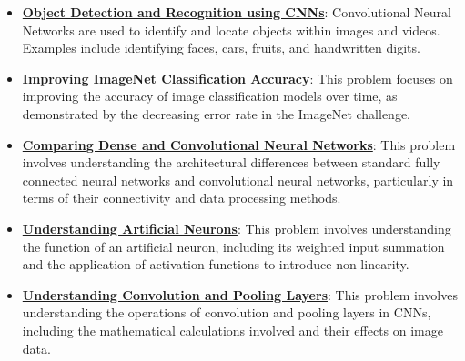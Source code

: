 \documentclass{article}%
\begin{document}
\begin{itemize}[leftmargin=*]%
\item \href{https://purdue.brightspace.com/d2l/common/assets/pdfjs-d2l-dist/1.0.14-legacy/web/viewer.html?file=\%2Fcontent\%2Fenforced\%2F1095467-wl.202510.CS.24300.001\%2F09L1-cnn.pdf\%3Fou\%3D1095467\&lang=en-us\&container=d2l-fileviewer-rendered-pdf\&fullscreen=d2l-fileviewer-rendered-pdf-dialog\&height=667#page=2}{\textbf{Object Detection and Recognition using CNNs}}: Convolutional Neural Networks are used to identify and locate objects within images and videos. Examples include identifying faces, cars, fruits, and handwritten digits.%
\item \href{https://purdue.brightspace.com/d2l/common/assets/pdfjs-d2l-dist/1.0.14-legacy/web/viewer.html?file=\%2Fcontent\%2Fenforced\%2F1095467-wl.202510.CS.24300.001\%2F09L1-cnn.pdf\%3Fou\%3D1095467\&lang=en-us\&container=d2l-fileviewer-rendered-pdf\&fullscreen=d2l-fileviewer-rendered-pdf-dialog\&height=667#page=3}{\textbf{Improving ImageNet Classification Accuracy}}: This problem focuses on improving the accuracy of image classification models over time, as demonstrated by the decreasing error rate in the ImageNet challenge.%
\item \href{https://purdue.brightspace.com/d2l/common/assets/pdfjs-d2l-dist/1.0.14-legacy/web/viewer.html?file=\%2Fcontent\%2Fenforced\%2F1095467-wl.202510.CS.24300.001\%2F09L1-cnn.pdf\%3Fou\%3D1095467\&lang=en-us\&container=d2l-fileviewer-rendered-pdf\&fullscreen=d2l-fileviewer-rendered-pdf-dialog\&height=667#page=4}{\textbf{Comparing Dense and Convolutional Neural Networks}}: This problem involves understanding the architectural differences between standard fully connected neural networks and convolutional neural networks, particularly in terms of their connectivity and data processing methods.%
\item \href{https://purdue.brightspace.com/d2l/common/assets/pdfjs-d2l-dist/1.0.14-legacy/web/viewer.html?file=\%2Fcontent\%2Fenforced\%2F1095467-wl.202510.CS.24300.001\%2F09L1-cnn.pdf\%3Fou\%3D1095467\&lang=en-us\&container=d2l-fileviewer-rendered-pdf\&fullscreen=d2l-fileviewer-rendered-pdf-dialog\&height=667#page=5}{\textbf{Understanding Artificial Neurons}}: This problem involves understanding the function of an artificial neuron, including its weighted input summation and the application of activation functions to introduce non-linearity.%
\item \href{https://purdue.brightspace.com/d2l/common/assets/pdfjs-d2l-dist/1.0.14-legacy/web/viewer.html?file=\%2Fcontent\%2Fenforced\%2F1095467-wl.202510.CS.24300.001\%2F09L1-cnn.pdf\%3Fou\%3D1095467\&lang=en-us\&container=d2l-fileviewer-rendered-pdf\&fullscreen=d2l-fileviewer-rendered-pdf-dialog\&height=667#page=6}{\textbf{Understanding Convolution and Pooling Layers}}: This problem involves understanding the operations of convolution and pooling layers in CNNs, including the mathematical calculations involved and their effects on image data.%

\end{itemize}
\end{document}
